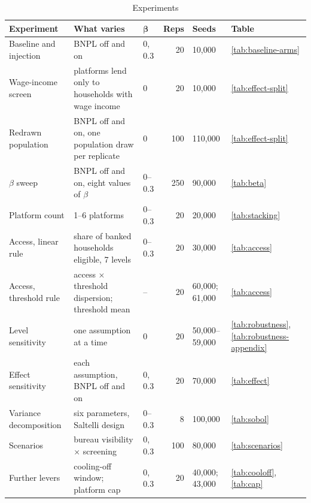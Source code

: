 \begin{table}[!htb]
\centering
\caption{Experiments}
\label{tab:experiments}
\begingroup\setlength{\tabcolsep}{4pt}\footnotesize
\begin{tabular}{H{3.45cm}L{4.5cm}L{1.0cm}rll}
\toprule
\textbf{Experiment} & \textbf{What varies} & $\boldsymbol{\beta}$ & \textbf{Reps} & \textbf{Seeds} & \textbf{Table} \\
\midrule
Baseline and injection & \ac{BNPL} off and on & 0, 0.3 & 20 & 10{,}000 & \ref{tab:baseline-arms} \\
\addlinespace
Wage-income screen & platforms lend only to households with wage income & 0 & 20 & 10{,}000 & \ref{tab:effect-split} \\
\addlinespace
Redrawn population & \ac{BNPL} off and on, one population draw per replicate & 0 & 100 & 110{,}000 & \ref{tab:effect-split} \\
\addlinespace
$\beta$ sweep & \ac{BNPL} off and on, eight values of $\beta$ & 0--0.3 & 250 & 90{,}000 & \ref{tab:beta} \\
\addlinespace
Platform count & 1--6 platforms & 0--0.3 & 20 & 20{,}000 & \ref{tab:stacking} \\
\addlinespace
Access, linear rule & share of banked households eligible, 7 levels & 0--0.3 & 20 & 30{,}000 & \ref{tab:access} \\
\addlinespace
Access, threshold rule & access $\times$ threshold dispersion; threshold mean & -- & 20 & 60{,}000; 61{,}000 & \ref{tab:access} \\
\addlinespace
Level sensitivity & one assumption at a time & 0 & 20 & 50{,}000--59{,}000 & \ref{tab:robustness}, \ref{tab:robustness-appendix} \\
\addlinespace
Effect sensitivity & each assumption, \ac{BNPL} off and on & 0, 0.3 & 20 & 70{,}000 & \ref{tab:effect} \\
\addlinespace
Variance decomposition & six parameters, Saltelli design & 0--0.3 & 8 & 100{,}000 & \ref{tab:sobol} \\
\addlinespace
Scenarios & bureau visibility $\times$ screening & 0, 0.3 & 100 & 80{,}000 & \ref{tab:scenarios} \\
\addlinespace
Further levers & cooling-off window; platform cap & 0, 0.3 & 20 & 40{,}000; 43{,}000 & \ref{tab:cooloff}, \ref{tab:cap} \\
\bottomrule
\end{tabular}
\endgroup
\end{table}

